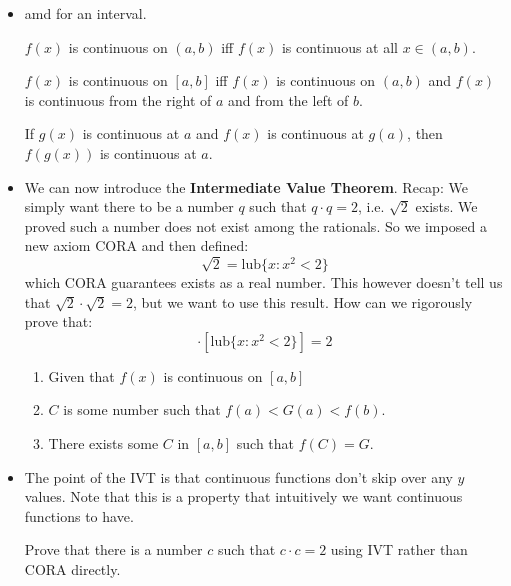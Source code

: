 \begin{itemize}
\begin{definition}
    \end{definition}
    \item amd for an interval.
    \begin{definition}
        $f(x)$ is continuous on $(a,b)$ iff $f(x)$ is continuous at all $x \in (a,b)$.
    \end{definition}
    \begin{definition}
        $f(x)$ is continuous on $[a,b]$ iff $f(x)$ is continuous on $(a,b)$ and $f(x)$ is continuous from the right of $a$ and from the left of $b$.
    \end{definition}
    \begin{theorem}
        If $g(x)$ is continuous at $a$ and $f(x)$ is continuous at $g(a)$, then $f(g(x))$ is continuous at $a$.
    \end{theorem}
    \item We can now introduce the \textbf{Intermediate Value Theorem}. Recap: We simply want there to be a number $q$ such that $q\cdot q=2$, i.e. $\sqrt{2}$ exists. We proved such a number does not exist among the rationals. So we imposed a new axiom CORA and then defined:
    \begin{equation}
        \sqrt{2}=\text{lub}\{x:x^2<2\}
        \label{eq:}
    \end{equation}
    which CORA guarantees exists as a real number. This however doesn't tell us that $\sqrt{2}\cdot\sqrt{2}=2$, but we want to use this result. How can we rigorously prove that:
    \begin{equation}
        [\text{lub}\{x:x^2<2\}]\cdot [\text{lub}\{x:x^2<2\}] = 2
        \label{eq:}
    \end{equation}
    \begin{theorem}
        \begin{enumerate}
            \item Given that $f(x)$ is continuous on $[a,b]$
            \item $C$ is some number such that $f(a)<G(a)<f(b)$.
            \item There exists some $C$ in $[a,b]$ such that $f(C)=G$.
        \end{enumerate}
    \end{theorem}
    \item The point of the IVT is that continuous functions don't skip over any $y$ values. Note that this is a property that intuitively we want continuous functions to have.
    \begin{example}
        Prove that there is a number $c$ such that $c\cdot c=2$ using IVT rather than CORA directly.
        \vspace{2mm}


\end{example}
\end{itemize}
